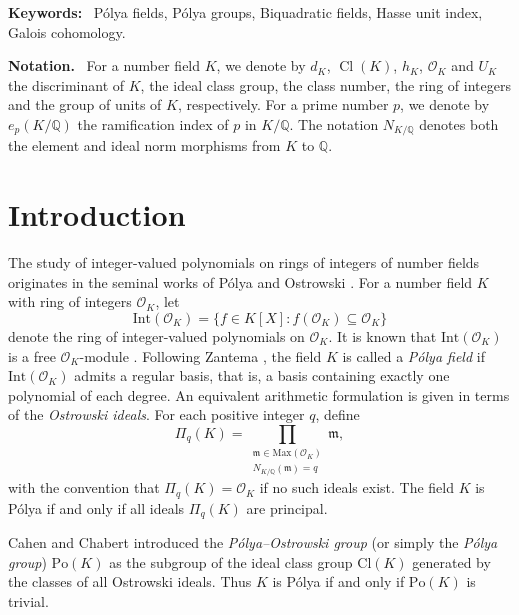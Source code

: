 \documentclass{jams-l}
\theoremstyle{definition}
\theoremstyle{remark}
\numberwithin{equation}{section}
\DeclareMathOperator{\Cl}{Cl}
\begin{document}
\vspace{.2cm} {\noindent \bf{Keywords:}}~ P\'olya fields, P\'olya groups, Biquadratic fields, Hasse unit index, Galois cohomology.


\vspace{.2cm} {\noindent \bf{Notation.}}~
For a number field $K$, we denote by $d_K$, $\Cl(K)$, $h_K$, $\mathcal{O}_K$ and $U_K$ the discriminant of $K$, the ideal class group, the class number, the ring of integers and  the group of units of $K$, respectively. For a prime number $p$, we denote by $e_p(K/\mathbb{Q})$ the ramification index of $p$ in $K/\mathbb{Q}$. The notation $N_{K/\mathbb{Q}}$ denotes both  the element and ideal norm morphisms from $K$ to $\mathbb{Q}$.

\section{Introduction}\label{intro}

The study of integer-valued polynomials on rings of integers of number fields
originates in the seminal works of P\'olya \cite{Polya} and Ostrowski \cite{Ostro}.
For a number field $K$ with ring of integers $\mathcal{O}_K$, let
\[
\mathrm{Int}(\mathcal{O}_K)
=
\{ f\in K[X] : f(\mathcal{O}_K)\subseteq \mathcal{O}_K \}
\]
denote the ring of integer-valued polynomials on $\mathcal{O}_K$.
It is known that $\mathrm{Int}(\mathcal{O}_K)$ is a free $\mathcal{O}_K$-module
\cite[Section~2]{Zantema}.
Following Zantema \cite{Zantema}, the field $K$ is called a \emph{P\'olya field} if
$\mathrm{Int}(\mathcal{O}_K)$ admits a regular basis, that is, a basis containing
exactly one polynomial of each degree. An equivalent arithmetic formulation is given in terms of the \emph{Ostrowski ideals}.
For each positive integer $q$, define
\[
\Pi_q(K)
=
\prod_{\substack{\mathfrak{m}\in\mathrm{Max}(\mathcal{O}_K)\\
		N_{K/\mathbb{Q}}(\mathfrak{m})=q}}
\mathfrak{m},
\]
with the convention that $\Pi_q(K)=\mathcal{O}_K$ if no such ideals exist. The field $K$ is P\'olya if and only if all ideals $\Pi_q(K)$ are principal.

Cahen and Chabert \cite{Cahen-Chabert's book} introduced the \emph{P\'olya--Ostrowski group}
(or simply the \emph{P\'olya group}) $\mathrm{Po}(K)$ as the subgroup of the ideal
class group $\mathrm{Cl}(K)$ generated by the classes of all Ostrowski ideals.
Thus $K$ is P\'olya if and only if $\mathrm{Po}(K)$ is trivial.
\end{document}
